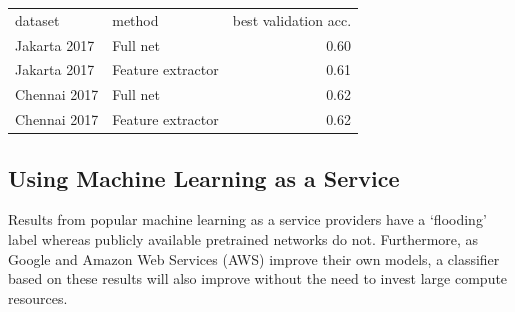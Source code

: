 \begin{tabular}{llr}\label{table:transfer_learning}
\toprule
      dataset &             method &  best validation acc. \\
 Jakarta 2017 &           Full net &                  0.60 \\
\midrule
 Jakarta 2017 &  Feature extractor &                  0.61 \\
 Chennai 2017 &           Full net &                  0.62 \\
 Chennai 2017 &  Feature extractor &                  0.62 \\
\bottomrule
\end{tabular}

\subsection{Using Machine Learning as a Service}
Results from popular machine learning as a service providers have a `flooding'
label whereas publicly available pretrained networks do not. Furthermore, as
Google and Amazon Web Services (AWS) improve their own models, a classifier
based on these results will also improve without the need to invest large
compute resources.

